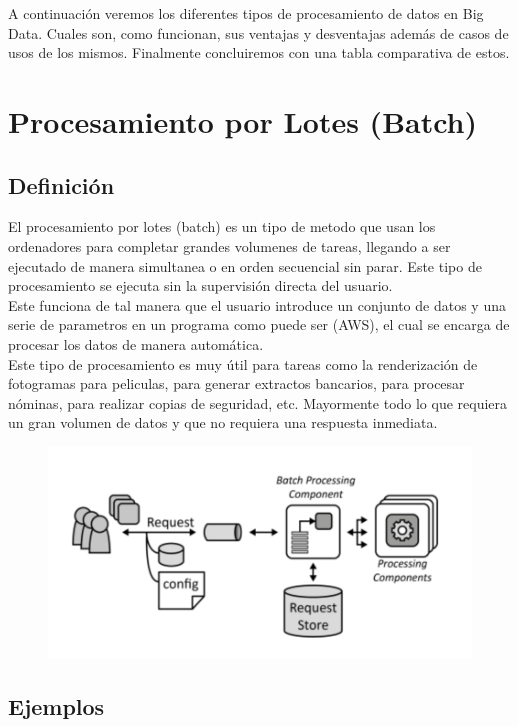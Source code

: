 \documentclass[12pt]{article}
\begin{document}
A continuación veremos los diferentes tipos de procesamiento de datos en Big Data. Cuales son, como funcionan, sus ventajas y desventajas
además de casos de usos de los mismos. Finalmente concluiremos con una tabla comparativa de estos.

\section{Procesamiento por Lotes (Batch)}

\subsection{Definición}

El procesamiento por lotes (batch) es un tipo de metodo que usan los ordenadores para completar grandes volumenes de tareas, llegando 
a ser ejecutado de manera simultanea o en orden secuencial sin parar. Este tipo de procesamiento se ejecuta sin la supervisión directa
del usuario.
\\
Este funciona de tal manera que el usuario introduce un conjunto de datos y una serie de parametros en un programa como puede ser (AWS), 
el cual se encarga de procesar los datos de manera automática.
\\
Este tipo de procesamiento es muy útil para tareas como la renderización de fotogramas para peliculas, para generar extractos bancarios,
para procesar nóminas, para realizar copias de seguridad, etc. Mayormente todo lo que requiera un gran volumen de datos y que no requiera
una respuesta inmediata.

\begin{figure}[h!]
    \centering
    \includegraphics[width=.6\textwidth]{Batch.PNG}
    \label{fig:my_label}
\end{figure}

\subsection{Ejemplos}
\end{document}
